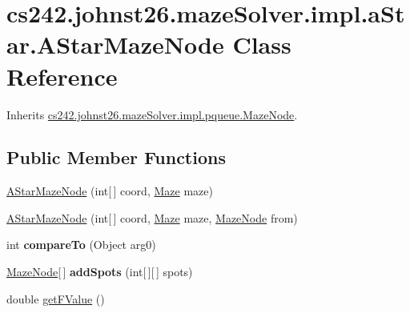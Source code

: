 \hypertarget{classcs242_1_1johnst26_1_1maze_solver_1_1impl_1_1a_star_1_1_a_star_maze_node}{\section{cs242.\-johnst26.\-maze\-Solver.\-impl.\-a\-Star.\-A\-Star\-Maze\-Node Class Reference}
\label{classcs242_1_1johnst26_1_1maze_solver_1_1impl_1_1a_star_1_1_a_star_maze_node}
}


Inherits \hyperlink{classcs242_1_1johnst26_1_1maze_solver_1_1impl_1_1pqueue_1_1_maze_node}{cs242.\-johnst26.\-maze\-Solver.\-impl.\-pqueue.\-Maze\-Node}.

\subsection*{Public Member Functions}
\begin{DoxyCompactItemize}
\item 
\hyperlink{classcs242_1_1johnst26_1_1maze_solver_1_1impl_1_1a_star_1_1_a_star_maze_node_affd4c9fd5808c57318197ee67d22af40}{A\-Star\-Maze\-Node} (int\mbox{[}$\,$\mbox{]} coord, \hyperlink{interfacecs242_1_1johnst26_1_1maze_1_1_maze}{Maze} maze)
\item 
\hyperlink{classcs242_1_1johnst26_1_1maze_solver_1_1impl_1_1a_star_1_1_a_star_maze_node_a617061f7392eeb79ccf05dc0152e0ada}{A\-Star\-Maze\-Node} (int\mbox{[}$\,$\mbox{]} coord, \hyperlink{interfacecs242_1_1johnst26_1_1maze_1_1_maze}{Maze} maze, \hyperlink{classcs242_1_1johnst26_1_1maze_solver_1_1impl_1_1pqueue_1_1_maze_node}{Maze\-Node} from)
\item 
\hypertarget{classcs242_1_1johnst26_1_1maze_solver_1_1impl_1_1a_star_1_1_a_star_maze_node_ad104d31e5758ac208bd39b0adbd56653}{int {\bfseries compare\-To} (Object arg0)}\label{classcs242_1_1johnst26_1_1maze_solver_1_1impl_1_1a_star_1_1_a_star_maze_node_ad104d31e5758ac208bd39b0adbd56653}

\item 
\hypertarget{classcs242_1_1johnst26_1_1maze_solver_1_1impl_1_1a_star_1_1_a_star_maze_node_af2af02b034dc384d8d29351dd1caca39}{\hyperlink{classcs242_1_1johnst26_1_1maze_solver_1_1impl_1_1pqueue_1_1_maze_node}{Maze\-Node}\mbox{[}$\,$\mbox{]} {\bfseries add\-Spots} (int\mbox{[}$\,$\mbox{]}\mbox{[}$\,$\mbox{]} spots)}\label{classcs242_1_1johnst26_1_1maze_solver_1_1impl_1_1a_star_1_1_a_star_maze_node_af2af02b034dc384d8d29351dd1caca39}

\item 
double \hyperlink{classcs242_1_1johnst26_1_1maze_solver_1_1impl_1_1a_star_1_1_a_star_maze_node_ad83cb72882be86238ec9671908c2cd8c}{get\-F\-Value} ()
\end{DoxyCompactItemize}
